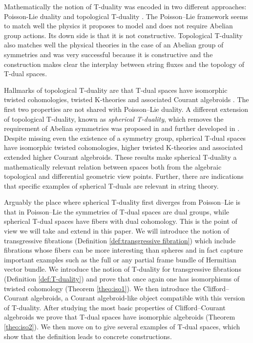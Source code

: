 \documentclass[12pt,twoside]{article}
\theoremstyle{plain}
\theoremstyle{definition}
\numberwithin{equation}{section}
\begin{document}
Mathematically the notion of T-duality was encoded in two different approaches: Poisson-Lie duality \cite{KlSe95} and topological T-duality \cite{BEM04}. The Poisson--Lie framework seems to match well the physics it proposes to model and does not require Abelian group actions. Its down side is that it is not constructive. Topological T-duality also matches well the physical theories in the case of an Abelian group of symmetries and was very successful because it  is constructive and the construction makes clear the interplay between string fluxes and the topology of T-dual spaces.

Hallmarks of topological T-duality are that T-dual spaces have isomorphic twisted cohomologies, twisted K-theories \cite{BEM04} and associated Courant algebroids \cite{CG11}. The first two properties are not shared with Poisson--Lie duality. A different extension of topological T-duality, known as {\it spherical T-duality}, which removes the requirement of Abelian symmetries was proposed in \cite{BEM15} and further developed in \cite{BEM15b,BEM18,LSW16,CHU24}. Despite missing even the existence of a symmetry group, spherical T-dual spaces have  isomorphic twisted cohomologies, higher twisted K-theories and associated extended higher Courant algebroids. These results make spherical T-duality a mathematically relevant relation between spaces both from the algebraic topological and differential geometric view points. Further,  there are indications that specific examples of spherical T-duals are relevant in string theory.

Arguably the place where spherical T-duality first diverges from Poisson--Lie is that in Poisson--Lie the symmetries of T-dual spaces are dual groups, while spherical T-dual spaces have fibers with dual cohomology. This is the point of view we will take and extend in this paper. We will introduce the notion of transgressive fibrations (Definition \ref{def:transgressive fibration}) which include fibrations whose fibers can be more interesting than spheres and in fact capture important examples such as  the full or any partial frame bundle of Hermitian vector bundle. We introduce the notion of T-duality for transgressive fibrations (Definition \ref{def:T-duality}) and prove that once again one has isomorphisms of twisted cohomology (Theorem \ref{theo:iso1}). We then introduce the Clifford--Courant algebroids, a Courant algebroid-like object compatible with this version of T-duality. After studying the most basic properties of Clifford--Courant algebroids we prove that T-dual spaces have isomorphic algebroids (Theorem \ref{theo:iso2}). We then move on to give several examples of T-dual spaces, which show that the definition leads to concrete constructions.
\end{document}
